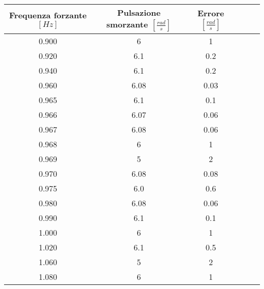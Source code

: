 \begin{tabular}{cccccc}
\toprule
Frequenza forzante $[Hz]$  & Pulsazione smorzante $[\frac{rad}{s}]$ & Errore $[\frac{rad}{s}]$\\ \midrule
0.900 & 6 & 1\\ \midrule
0.920 & 6.1 & 0.2\\ \midrule
0.940 & 6.1 & 0.2\\ \midrule
0.960 & 6.08 & 0.03\\ \midrule
0.965 & 6.1 & 0.1\\ \midrule
0.966 & 6.07 & 0.06\\ \midrule
0.967 & 6.08 & 0.06\\ \midrule
0.968 & 6 & 1\\ \midrule
0.969 & 5 & 2\\ \midrule
0.970 & 6.08 & 0.08\\ \midrule
0.975 & 6.0 & 0.6\\ \midrule
0.980 & 6.08 & 0.06\\ \midrule
0.990 & 6.1 & 0.1\\ \midrule
1.000 & 6 & 1\\ \midrule
1.020 & 6.1 & 0.5\\ \midrule
1.060 & 5 & 2\\ \midrule
1.080 & 6 & 1\\ \bottomrule
\end{tabular}
